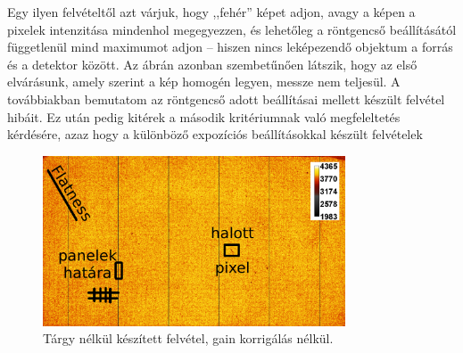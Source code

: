 \documentclass[a4paper,12pt,twoside]{article}
\begin{document}
Egy ilyen felvételtől azt várjuk, hogy ,,fehér'' képet adjon, avagy a képen a pixelek intenzitása mindenhol megegyezzen, és lehetőleg a röntgencső beállításától függetlenül mind maximumot adjon -- hiszen nincs leképezendő objektum a forrás és a detektor között. Az ábrán azonban szembetűnően látszik, hogy az első elvárásunk, amely szerint a kép homogén legyen, messze nem teljesül. A továbbiakban bemutatom az röntgencső adott beállításai mellett készült felvétel hibáit. Ez után pedig kitérek a második kritériumnak való megfeleltetés kérdésére, azaz hogy a különböző expozíciós beállításokkal készült felvételek 

\begin{figure}[htbp]
\center
\includegraphics[width=0.8\textwidth]{abrak/gainnelkul}
\caption{Tárgy nélkül készített felvétel, gain korrigálás nélkül.}
\label{fig:gainnelkul}
\end{figure}


\clearpage

\begin{thebibliography}{9}



\end{thebibliography}
\end{document}
